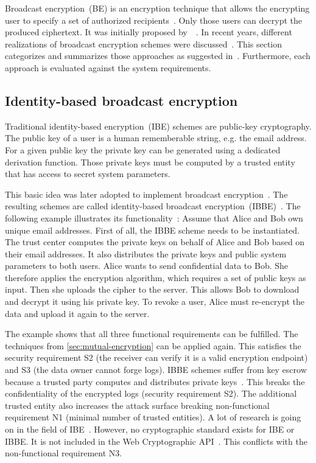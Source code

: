 \documentclass[../main.tex]{subfiles}
\begin{document}
Broadcast encryption~(BE) is an encryption technique that allows the encrypting user to specify a set of authorized recipients~\cite{Hagg2022}.
Only those users can decrypt the produced ciphertext.
It was initially proposed by~\citeauthor{fiat1993broadcast}~\cite{fiat1993broadcast}.
In recent years, different realizations of broadcast encryption schemes were discussed~\cite{Sakai2007, Li2018, Hagg2022, Fan2013}.
This section categorizes and summarizes those approaches as suggested in~\cite{Hagg2022}.
Furthermore, each approach is evaluated against the system requirements.

\subsection{Identity-based broadcast encryption} 
\label{sec:broadcast-identity}

Traditional identity-based encryption~(IBE) schemes are public-key cryptography.
The public key of a user is a human rememberable string, e.g. the email address.
For a given public key the private key can be generated using a dedicated derivation function.
Those private keys must be computed by a trusted entity that has access to secret system parameters.~\cite{shamir1985}

This basic idea was later adopted to implement broadcast encryption~\cite{Hagg2022}.
The resulting schemes are called identity-based broadcast encryption~(IBBE)~\cite{Sakai2007}.
The following example illustrates its functionality~\cite{Hagg2022}:
Assume that Alice and Bob own unique email addresses.
First of all, the IBBE scheme needs to be instantiated.
The trust center computes the private keys on behalf of Alice and Bob based on their email addresses.
It also distributes the private keys and public system parameters to both users.
Alice wants to send confidential data to Bob.
She therefore applies the encryption algorithm, which requires a set of public keys as input.
Then she uploads the cipher to the server.
This allows Bob to download and decrypt it using his private key.
To revoke a user, Alice must re-encrypt the data and upload it again to the server.

The example shows that all three functional requirements can be fulfilled.
The techniques from \cref{sec:mutual-encryption} can be applied again.
This satisfies the security requirement S2 (the receiver can verify it is a valid encryption endpoint) and S3 (the data owner cannot forge logs).
IBBE schemes suffer from key escrow because a trusted party computes and distributes private keys~\cite{Hagg2022}.
This breaks the confidentiality of the encrypted logs (security requirement S2).
The additional trusted entity also increases the attack surface breaking non-functional requirement N1 (minimal number of trusted entities).
A lot of research is going on in the field of IBE~\cite{Hagg2022}.
However, no cryptographic standard exists for IBE or IBBE.
It is not included in the Web Cryptographic API~\cite{WebCryptoApi2017}.
This conflicts with the non-functional requirement N3.
\end{document}
